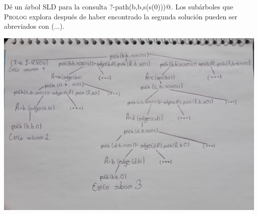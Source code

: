 \documentclass[12pt,letterpaper]{article}
\begin{document}
\begin{enumerate}
  Dé un árbol SLD para la consulta \verb@?-path(b,b,s(s(0)))@. Los subárboles que \textsc{Prolog} explora después de haber encontrado la segunda solución pueden ser abreviados con ($\ldots$).

  \begin{center}
    \hspace{-1.2cm} \includegraphics[width=\textwidth,height=0.6\textheight,keepaspectratio]{ejercicio5.png}
  \end{center}
  
\end{enumerate}
\end{document}
